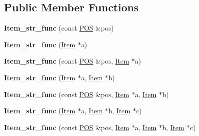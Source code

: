 \subsection*{Public Member Functions}
\begin{DoxyCompactItemize}
\item 
\mbox{\label{classItem__str__func_ad36238727f9e8a58d4f2ac863191f4c3}} 
{\bfseries Item\+\_\+str\+\_\+func} (const \mbox{\hyperlink{structYYLTYPE}{P\+OS}} \&pos)
\item 
\mbox{\label{classItem__str__func_a8479244cdf46ea0b54f07b62259081fd}} 
{\bfseries Item\+\_\+str\+\_\+func} (\mbox{\hyperlink{classItem}{Item}} $\ast$a)
\item 
\mbox{\label{classItem__str__func_aae411cb6acda51997c5cd2d4c5f460ae}} 
{\bfseries Item\+\_\+str\+\_\+func} (const \mbox{\hyperlink{structYYLTYPE}{P\+OS}} \&pos, \mbox{\hyperlink{classItem}{Item}} $\ast$a)
\item 
\mbox{\label{classItem__str__func_a0a3c517e73d5e700a36e0b749c6e0753}} 
{\bfseries Item\+\_\+str\+\_\+func} (\mbox{\hyperlink{classItem}{Item}} $\ast$a, \mbox{\hyperlink{classItem}{Item}} $\ast$b)
\item 
\mbox{\label{classItem__str__func_ade8408da52e17ea46201567a98aed0ca}} 
{\bfseries Item\+\_\+str\+\_\+func} (const \mbox{\hyperlink{structYYLTYPE}{P\+OS}} \&pos, \mbox{\hyperlink{classItem}{Item}} $\ast$a, \mbox{\hyperlink{classItem}{Item}} $\ast$b)
\item 
\mbox{\label{classItem__str__func_aa25f616d2464ad77ec7922d5798fc012}} 
{\bfseries Item\+\_\+str\+\_\+func} (\mbox{\hyperlink{classItem}{Item}} $\ast$a, \mbox{\hyperlink{classItem}{Item}} $\ast$b, \mbox{\hyperlink{classItem}{Item}} $\ast$c)
\item 
\mbox{\label{classItem__str__func_a4f694e447a6229eebf842760fd51ac63}} 
{\bfseries Item\+\_\+str\+\_\+func} (const \mbox{\hyperlink{structYYLTYPE}{P\+OS}} \&pos, \mbox{\hyperlink{classItem}{Item}} $\ast$a, \mbox{\hyperlink{classItem}{Item}} $\ast$b, \mbox{\hyperlink{classItem}{Item}} $\ast$c)
\item 

\end{DoxyCompactItemize}
